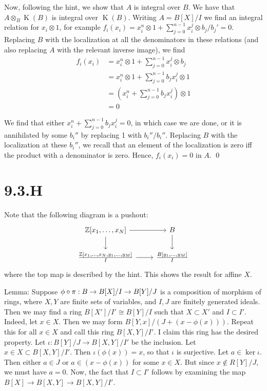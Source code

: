 \documentclass{article}
\begin{document}
Now, following the hint, we show that $A$ is integral over
$B$. We have that $A \otimes_B \operatorname{K}(B)$ is integral over
$\operatorname{K}(B)$. Writing $A=B[X]/I$ we find an integral
relation for $x_i \otimes 1$, for example $f_i(x_i)=x_i^n \otimes 1+\sum_{j=0}^{n-1} x_i^j \otimes b_j/b_j'=0$.
Replacing $B$ with the localization at all the denominators
in these relations (and also replacing $A$ with the
relevant inverse image), we find
\begin{align*}
    f_i(x_i) & =x_i^n \otimes 1+\sum_{j=0}^{n-1} x_i^j \otimes b_j  \\
             & =x_i^n \otimes 1+\sum_{j=0}^{n-1} b_jx_i^j \otimes 1 \\
             & = (x_i^n+\sum_{j=0}^{n-1} b_jx_i^j) \otimes 1        \\
             & =0
\end{align*}

We find that either $x_i^n+\sum_{j=0}^{n-1} b_jx_i^j=0$, in which case we are done, or it
is annihilated by some $b_i''$ by replacing 1 with
$b_i''/b_i''$. Replacing $B$ with the
localization at these $b_i''$, we recall that an element of the
localization is zero iff the product with a denominator is zero. Hence,
$f_i(x_i)=0$ in $A$. \qed

\section{9.3.H}
Note that the following diagram is a pushout: \[\begin{tikzcd}
        {\Z[x_1, \dots, x_N]} & B \\{\frac{\Z[x_1,\dots, x_N,y_1, \dots, y_M]}{I}}
                              & {\frac{B[y_1, \dots, y_M]}{I}}
        \arrow[from=1-2, to=2-2]
        \arrow[from=1-1, to=1-2]
        \arrow[from=2-1, to=2-2]
        \arrow[from=1-1, to=2-1]
    \end{tikzcd}\] where the
top map is described by the hint. This shows the result for affine
$X$.

Lemma: Suppose $\phi \circ \pi: B \to B[X]/I \to
    B[Y]/J$ is a composition of morphism of rings,
where $X, Y$ are finite sets of variables, and
$I, J$ are finitely generated ideals. Then we may find a ring
$B[X']/I' \cong B[Y]/I$ such that $X \subset X'$ and
$I \subset I'$. Indeed, let $x \in X$. Then we may form
$B[Y, x]/(J+(x-\phi(x)))$. Repeat this for all $x \in X$ and call
this ring $B[X, Y]/I'$. I claim this ring has the desired property.
Let $\iota: B[Y]/J \to B[X, Y]/I'$ be the inclusion. Let $x \in X \subset B[X, Y]/I'$. Then
$\iota(\phi(x))=x$, so that $\iota$ is surjective. Let
$a \in \ker \iota$. Then either $a \in J$ or
$a \in (x-\phi(x))$ for some $x \in X$. But since
$x \notin R[Y]/J$, we must have $a = 0$. Now, the fact
that $I \subset I'$ follows by examining the map
$B[X] \to B[X, Y] \to
    B[X, Y]/I'$.
\end{document}
